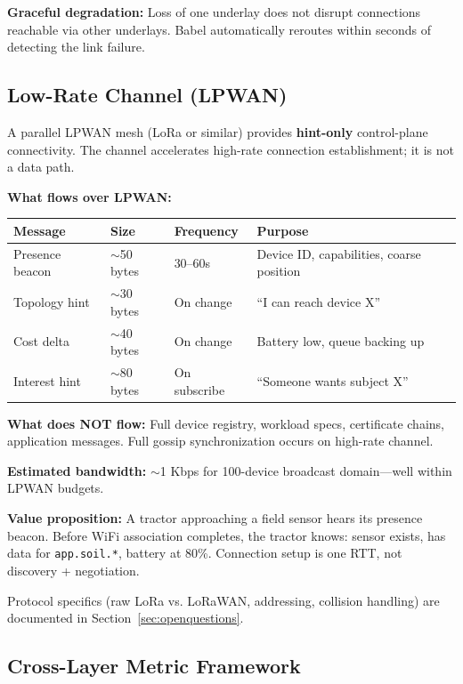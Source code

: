 \textbf{Graceful degradation:} Loss of one underlay does not disrupt connections reachable via other underlays. Babel automatically reroutes within seconds of detecting the link failure.

\subsection{Low-Rate Channel (LPWAN)}

A parallel LPWAN mesh (LoRa or similar) provides \textbf{hint-only} control-plane connectivity. The channel accelerates high-rate connection establishment; it is not a data path.

\textbf{What flows over LPWAN:}

\begin{tabular}{@{}llll@{}}
\toprule
\textbf{Message} & \textbf{Size} & \textbf{Frequency} & \textbf{Purpose} \\
\midrule
Presence beacon & $\sim$50 bytes & 30--60s & Device ID, capabilities, coarse position \\
Topology hint & $\sim$30 bytes & On change & ``I can reach device X'' \\
Cost delta & $\sim$40 bytes & On change & Battery low, queue backing up \\
Interest hint & $\sim$80 bytes & On subscribe & ``Someone wants subject X'' \\
\bottomrule
\end{tabular}

\textbf{What does NOT flow:} Full device registry, workload specs, certificate chains, application messages. Full gossip synchronization occurs on high-rate channel.

\textbf{Estimated bandwidth:} $\sim$1 Kbps for 100-device broadcast domain---well within LPWAN budgets.

\textbf{Value proposition:} A tractor approaching a field sensor hears its presence beacon. Before WiFi association completes, the tractor knows: sensor exists, has data for \texttt{app.soil.*}, battery at 80\%. Connection setup is one RTT, not discovery + negotiation.

Protocol specifics (raw LoRa vs. LoRaWAN, addressing, collision handling) are documented in Section~\ref{sec:openquestions}.

\subsection{Cross-Layer Metric Framework}
\label{sec:crosslayer}

